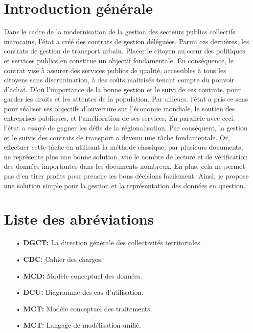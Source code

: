 \documentclass[a4paper]{report}
\begin{document}
\newpage

\begin{doublespace}
	\chapter*{\centering Introduction générale}

	Dans le cadre de la modernisation de la gestion des secteurs publics
	collectifs
	marocains, l’état a créé des contrats de gestion déléguées. Parmi ces
	dernières, les
	contrats de gestion de transport urbain. Placer le citoyen au cœur des
	politiques et
	services publics en constitue un objectif fondamentale. En conséquence, le
	contrat
	vise à assurer des services publics de qualité, accessibles à tous les
	citoyens sans discrimination, à des coûts maitrisés tenant compte du
	pouvoir
	d’achat. D'où  l'importance de la bonne gestion et le suivi de ces
	contrats, pour garder
	les droits et les attentes de la population.
	Par ailleurs, l’état a pris ce sens pour réaliser ses objectifs d’ouverture
	sur l’économie
	mondiale, le soutien des entreprises publiques, et l’amélioration de ses
	services.
	En parallèle avec ceci, l’état a essayé de gagner les défis de la
	régionalisation.
	Par conséquent, la gestion et le suivis des contrats de transport a devenu
	une tâche
	fondamentale. Or, effectuer cette tâche en utilisant la méthode classique,
	par plusieurs documents,
	ne représente plus une bonne solution, vue le nombre de lecture et de
	vérification
	des données importantes dans les documents nombreux. En plus, cela ne
	permet pas d’en
	tirer profits pour prendre les bons décisions facilement. Ainsi, je propose
	une
	solution simple pour la gestion et la représentation des données en
	question.

	\newpage

	\chapter*{\centering Liste des abréviations}
	\begin{itemize}
		\item[•] \textbf{DGCT:} La direction générale des collectivités territoriales.
		\item[•] \textbf{CDC:} Cahier des charges.
		\item[•] \textbf{MCD:} Modèle conceptuel des données.
		\item[•] \textbf{DCU:} Diagramme des cas d'utilisation.
		\item[•] \textbf{MCT:} Modèle conceptuel des traitements.
		\item[•] \textbf{MCT:} Langage de modélisation unifié.
	\end{itemize}


\end{doublespace}
\end{document}
